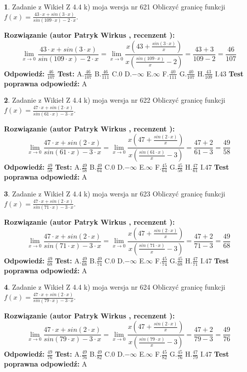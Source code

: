\documentclass[12pt, a4paper]{article}
\theoremstyle{definition} %
\newtheorem{zad}{}
\newcommand{\zadStart}[1]{\begin{zad}#1\newline}
\newcommand{\zadStop}{\end{zad}}
\newcommand{\rozwStart}[2]{\noindent \textbf{Rozwiązanie (autor #1 , recenzent #2): }\newline}
\newcommand{\rozwStop}{\newline}
\newcommand{\odpStart}{\noindent \textbf{Odpowiedź:}\newline}
\newcommand{\odpStop}{\newline}
\newcommand{\testStart}{\noindent \textbf{Test:}\newline}
\newcommand{\testStop}{\newline}
\newcommand{\kluczStart}{\noindent \textbf{Test poprawna odpowiedź:}\newline}
\newcommand{\kluczStop}{\newline}
\begin{document}
\zadStart{Zadanie z Wikieł Z 4.4 k) moja wersja nr 621}
Obliczyć granicę funkcji $f(x)=\frac{43\cdot x +sin(3\cdot x)}{sin(109\cdot x) -2\cdot x}$.
\zadStop
\rozwStart{Patryk Wirkus}{}
$$\lim\limits_{x\to 0}\frac{43\cdot x +sin(3\cdot x)}{sin(109\cdot x) -2\cdot x}
=\lim\limits_{x\to 0}\frac{x(43+\frac{sin(3\cdot x)}{x})}{x(\frac{sin(109\cdot x)}{x}-2)}
=\frac{43+3}{109-2} = \frac{46}{107}$$
\rozwStop
\odpStart
$\frac{46}{107}$
\odpStop
\testStart
A.$\frac{46}{107}$
B.$\frac{46}{111}$
C.$0$
D.$-\infty$
E.$\infty$
F.$\frac{40}{111}$
G.$\frac{40}{107}$
H.$\frac{43}{109}$
I.$43$
\testStop
\kluczStart
A
\kluczStop



\zadStart{Zadanie z Wikieł Z 4.4 k) moja wersja nr 622}
Obliczyć granicę funkcji $f(x)=\frac{47\cdot x +sin(2\cdot x)}{sin(61\cdot x) -3\cdot x}$.
\zadStop
\rozwStart{Patryk Wirkus}{}
$$\lim\limits_{x\to 0}\frac{47\cdot x +sin(2\cdot x)}{sin(61\cdot x) -3\cdot x}
=\lim\limits_{x\to 0}\frac{x(47+\frac{sin(2\cdot x)}{x})}{x(\frac{sin(61\cdot x)}{x}-3)}
=\frac{47+2}{61-3} = \frac{49}{58}$$
\rozwStop
\odpStart
$\frac{49}{58}$
\odpStop
\testStart
A.$\frac{49}{58}$
B.$\frac{49}{64}$
C.$0$
D.$-\infty$
E.$\infty$
F.$\frac{45}{64}$
G.$\frac{45}{58}$
H.$\frac{47}{61}$
I.$47$
\testStop
\kluczStart
A
\kluczStop



\zadStart{Zadanie z Wikieł Z 4.4 k) moja wersja nr 623}
Obliczyć granicę funkcji $f(x)=\frac{47\cdot x +sin(2\cdot x)}{sin(71\cdot x) -3\cdot x}$.
\zadStop
\rozwStart{Patryk Wirkus}{}
$$\lim\limits_{x\to 0}\frac{47\cdot x +sin(2\cdot x)}{sin(71\cdot x) -3\cdot x}
=\lim\limits_{x\to 0}\frac{x(47+\frac{sin(2\cdot x)}{x})}{x(\frac{sin(71\cdot x)}{x}-3)}
=\frac{47+2}{71-3} = \frac{49}{68}$$
\rozwStop
\odpStart
$\frac{49}{68}$
\odpStop
\testStart
A.$\frac{49}{68}$
B.$\frac{49}{74}$
C.$0$
D.$-\infty$
E.$\infty$
F.$\frac{45}{74}$
G.$\frac{45}{68}$
H.$\frac{47}{71}$
I.$47$
\testStop
\kluczStart
A
\kluczStop



\zadStart{Zadanie z Wikieł Z 4.4 k) moja wersja nr 624}
Obliczyć granicę funkcji $f(x)=\frac{47\cdot x +sin(2\cdot x)}{sin(79\cdot x) -3\cdot x}$.
\zadStop
\rozwStart{Patryk Wirkus}{}
$$\lim\limits_{x\to 0}\frac{47\cdot x +sin(2\cdot x)}{sin(79\cdot x) -3\cdot x}
=\lim\limits_{x\to 0}\frac{x(47+\frac{sin(2\cdot x)}{x})}{x(\frac{sin(79\cdot x)}{x}-3)}
=\frac{47+2}{79-3} = \frac{49}{76}$$
\rozwStop
\odpStart
$\frac{49}{76}$
\odpStop
\testStart
A.$\frac{49}{76}$
B.$\frac{49}{82}$
C.$0$
D.$-\infty$
E.$\infty$
F.$\frac{45}{82}$
G.$\frac{45}{76}$
H.$\frac{47}{79}$
I.$47$
\testStop
\kluczStart
A
\kluczStop
\end{document}
